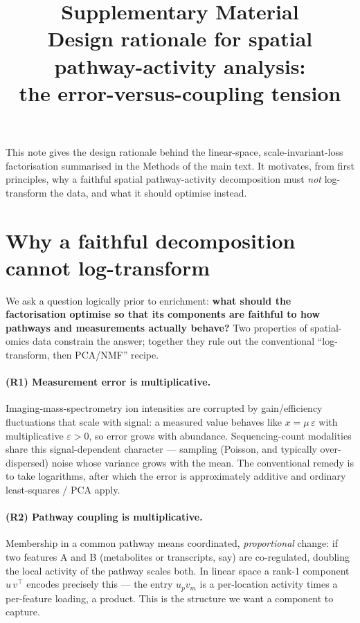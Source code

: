 \documentclass[11pt]{article}
\title{Supplementary Material\\
\large Design rationale for spatial pathway-activity analysis:\\
the error-versus-coupling tension}
\author{}
\date{}
\begin{document}
\maketitle

This note gives the design rationale behind the linear-space, scale-invariant-loss
factorisation summarised in the Methods of the main text. It motivates, from first
principles, why a faithful spatial pathway-activity decomposition must \emph{not}
log-transform the data, and what it should optimise instead.

\section{Why a faithful decomposition cannot log-transform}
\label{s:rationale}

We ask a question logically prior to enrichment: \textbf{what should the factorisation
optimise so that its components are faithful to how pathways and measurements actually
behave?} Two properties of spatial-omics data constrain the answer; together they rule out
the conventional ``log-transform, then PCA/NMF'' recipe.

\paragraph{(R1) Measurement error is multiplicative.} Imaging-mass-spectrometry ion
intensities are corrupted by gain/efficiency fluctuations that scale with signal: a measured
value behaves like $x = \mu\,\varepsilon$ with multiplicative $\varepsilon > 0$, so error
grows with abundance. Sequencing-count modalities share this signal-dependent character ---
sampling (Poisson, and typically over-dispersed) noise whose variance grows with the mean.
The conventional remedy is to take logarithms, after which the error is approximately additive
and ordinary least-squares / PCA apply.

\paragraph{(R2) Pathway coupling is multiplicative.} Membership in a common pathway means
coordinated, \emph{proportional} change: if two features A and B (metabolites or transcripts,
say) are co-regulated, doubling the local activity of the pathway scales both. In linear space
a rank-1 component $u\,v^{\!\top}$ encodes precisely this --- the entry $u_p v_m$ is a
per-location activity times a per-feature loading, a product. This is the structure we want a
component to capture.
\end{document}
